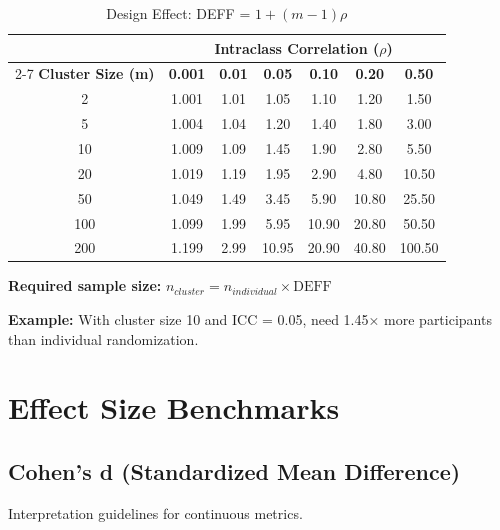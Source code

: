 \begin{table}[h]
\centering
\caption{Design Effect: DEFF = $1 + (m-1)\rho$}
\begin{tabular}{c|cccccc}
\toprule
& \multicolumn{6}{c}{\textbf{Intraclass Correlation ($\rho$)}} \\
\cmidrule{2-7}
\textbf{Cluster Size (m)} & \textbf{0.001} & \textbf{0.01} & \textbf{0.05} & \textbf{0.10} & \textbf{0.20} & \textbf{0.50} \\
\midrule
2 & 1.001 & 1.01 & 1.05 & 1.10 & 1.20 & 1.50 \\
5 & 1.004 & 1.04 & 1.20 & 1.40 & 1.80 & 3.00 \\
10 & 1.009 & 1.09 & 1.45 & 1.90 & 2.80 & 5.50 \\
20 & 1.019 & 1.19 & 1.95 & 2.90 & 4.80 & 10.50 \\
50 & 1.049 & 1.49 & 3.45 & 5.90 & 10.80 & 25.50 \\
100 & 1.099 & 1.99 & 5.95 & 10.90 & 20.80 & 50.50 \\
200 & 1.199 & 2.99 & 10.95 & 20.90 & 40.80 & 100.50 \\
\bottomrule
\end{tabular}
\end{table}

\textbf{Required sample size:} $n_{cluster} = n_{individual} \times \text{DEFF}$

\textbf{Example:} With cluster size 10 and ICC = 0.05, need 1.45× more participants than individual randomization.

\newpage

\section{Effect Size Benchmarks}

\subsection{Cohen's d (Standardized Mean Difference)}

Interpretation guidelines for continuous metrics.

